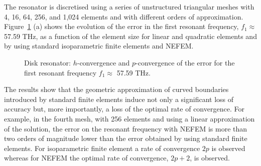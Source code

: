 The resonator is discretised using a series of unstructured triangular meshes with 4, 16, 64, 256, and 1,024 elements and with different orders of approximation. Figure~\ref{fig:circleFEMvsNEFEM_Convergence} (a) shows the evolution of the error in the first resonant frequency, $f_1 \approx$ 57.59 THz, as a function of the element size for linear and quadratic elements and by using standard isoparametric finite elements and NEFEM. 
\begin{figure}[!ht]
	\centering
	\caption{Disk resonator: $h$-convergence and $p$-convergence of the error for the first resonant frequency $f_1 \approx$ 57.59 THz.}
	\label{fig:circleFEMvsNEFEM_Convergence}
\end{figure}
The results show that the geometric approximation of curved boundaries introduced by standard finite elements induce not only a significant loss of accuracy but, more importantly, a loss of the optimal rate of convergence. For example, in the fourth mesh, with 256 elements and using a linear approximation of the solution, the error on the resonant frequency with NEFEM is more than two orders of magnitude lower than the error obtained by using standard finite elements. For isoparametric finite element a rate of convergence $2p$ is observed whereas for NEFEM the optimal rate of convergence, $2p+2$, is observed. 

